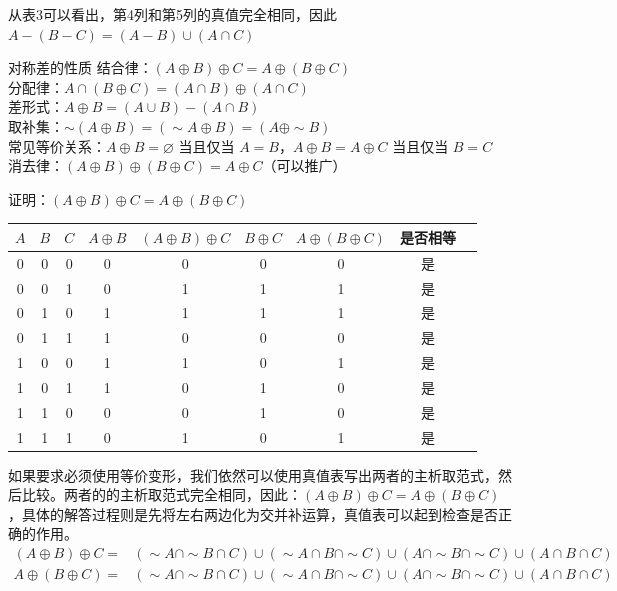 从表3可以看出，第4列和第5列的真值完全相同，因此$A - (B - C) = (A - B) \cup (A \cap C)$
\begin{theorem}{对称差的性质}{}
    结合律：$(A \oplus B) \oplus C = A \oplus (B \oplus C)$\\
    分配律：$A \cap (B \oplus C) = (A \cap B) \oplus (A \cap C)$\\
    差形式：$A \oplus B = (A \cup B) - (A \cap B)$\\
    取补集：$\sim(A \oplus B) = (\sim A \oplus B) = (A \oplus \sim B)$\\
    常见等价关系：$A \oplus B = \varnothing$ 当且仅当 $A = B$，$A \oplus B = A \oplus C$ 当且仅当 $B = C$\\
    消去律：$(A \oplus B) \oplus (B \oplus C) = A \oplus C$（可以推广）
\end{theorem}
证明：$(A \oplus B) \oplus C = A \oplus (B \oplus C)$
\begin{center}
\begin{tabular}{ccc|cccccc}
$A$ & $B$ & $C$ & $A \oplus B$ & $(A \oplus B) \oplus C$ & $B \oplus C$ & $A \oplus (B \oplus C)$ & 是否相等 \\
\hline
0 & 0 & 0 & 0 & 0 & 0 & 0 & 是 \\
0 & 0 & 1 & 0 & 1 & 1 & 1 & 是 \\
0 & 1 & 0 & 1 & 1 & 1 & 1 & 是 \\
0 & 1 & 1 & 1 & 0 & 0 & 0 & 是 \\
1 & 0 & 0 & 1 & 1 & 0 & 1 & 是 \\
1 & 0 & 1 & 1 & 0 & 1 & 0 & 是 \\
1 & 1 & 0 & 0 & 0 & 1 & 0 & 是 \\
1 & 1 & 1 & 0 & 1 & 0 & 1 & 是 \\
\end{tabular}
\end{center}
如果要求必须使用等价变形，我们依然可以使用真值表写出两者的主析取范式，然后比较。两者的的主析取范式完全相同，因此：$(A \oplus B) \oplus C = A \oplus (B \oplus C)$，具体的解答过程则是先将左右两边化为交并补运算，真值表可以起到检查是否正确的作用。
\begin{align*}
(A \oplus B) \oplus C = & (\sim A \cap \sim B \cap C) \cup 
                        (\sim A \cap B \cap \sim C) \cup (A \cap \sim B \cap \sim C) \cup 
                        (A \cap B \cap C)\\
A \oplus (B \oplus C) = & (\sim A \cap \sim B \cap C) \cup 
                         (\sim A \cap B \cap \sim C) \cup 
                         (A \cap \sim B \cap \sim C) \cup 
                         (A \cap B \cap C)
\end{align*}
